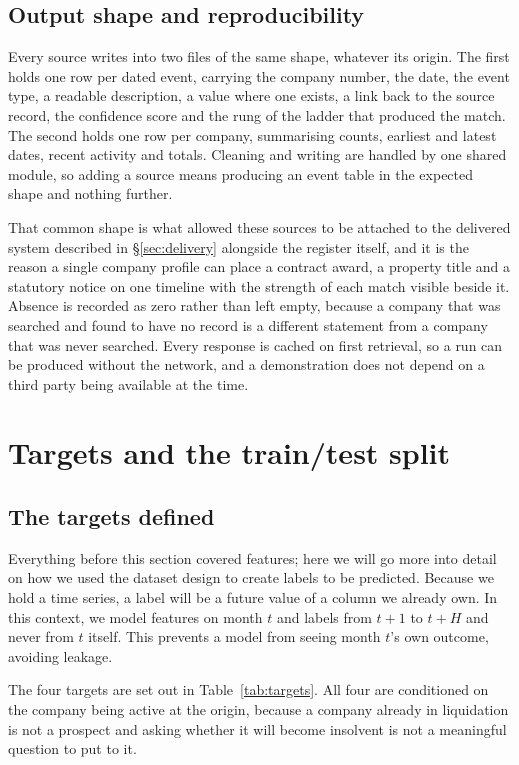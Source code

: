 \documentclass[    author={Samuel Menon Demelo; Sneha Saphala Ram Prasad; 
Viktor Ander Lindholm; Vishal Khatri},
               supervisor={Prof. Fernando Moreno-Pino},
                   degree={MSc},
                    title={Lloyds Commercial Banking Intelligence},
                 subtitle={Ranking SME Lending, Risk and Growth Prospects for Lloyds Banking Group},
                     type={},
                     year={2026}]{dissertation}
\begin{document}
\subsection{Output shape and reproducibility}
Every source writes into two files of the same shape, whatever its origin. The first holds one row per dated event, carrying the company number, the date, the event type, a readable description, a value where one exists, a link back to the source record, the confidence score and the rung of the ladder that produced the match. The second holds one row per company, summarising counts, earliest and latest dates, recent activity and totals. Cleaning and writing are handled by one shared module, so adding a source means producing an event table in the expected shape and nothing further.

That common shape is what allowed these sources to be attached to the delivered system described in \S\ref{sec:delivery} alongside the register itself, and it is the reason a single company profile can place a contract award, a property title and a statutory notice on one timeline with the strength of each match visible beside it. Absence is recorded as zero rather than left empty, because a company that was searched and found to have no record is a different statement from a company that was never searched. Every response is cached on first retrieval, so a run can be produced without the network, and a demonstration does not depend on a third party being available at the time.


\section{Targets and the train/test split}
\label{sec:targets}

\subsection{The targets defined}
Everything before this section covered features; here we will go more into detail on how we used the dataset design to create labels to be predicted. Because we hold a time series, a label will be a future value of a column we already own. In this context, we model features on month $t$ and labels from $t+1$ to $t+H$ and never from $t$ itself. This prevents a model from seeing month $t$'s own outcome, avoiding leakage.

The four targets are set out in Table~\ref{tab:targets}. All four are conditioned on the company being active at the origin, because a company already in liquidation is not a prospect and asking whether it will become insolvent is not a meaningful question to put to it.
\end{document}
